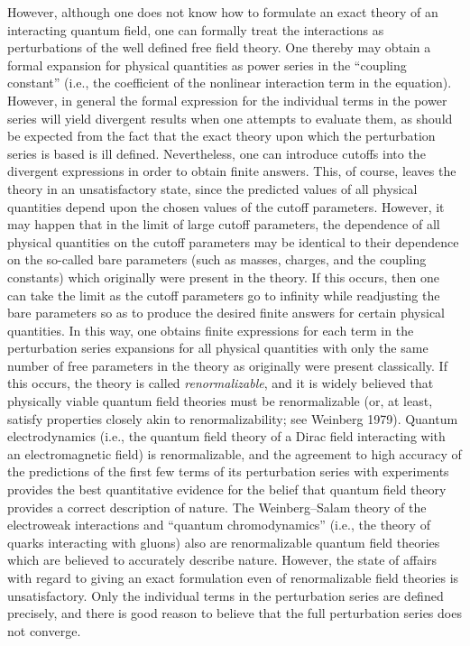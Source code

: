 However, although one does not know how to formulate an exact theory of an
interacting quantum field, one can formally treat the interactions as perturbations of
the well defined free field theory. One thereby may obtain a formal expansion for
physical quantities as power series in the ``coupling constant'' (i.e., the coefficient of
the nonlinear interaction term in the equation). However, in general the formal
expression for the individual terms in the power series will yield divergent results
when one attempts to evaluate them, as should be expected from the fact that the
exact theory upon which the perturbation series is based is ill defined. Nevertheless,
one can introduce cutoffs into the divergent expressions in order to obtain finite
answers. This, of course, leaves the theory in an unsatisfactory state, since the
predicted values of all physical quantities depend upon the chosen values of the
cutoff parameters. However, it may happen that in the limit of large cutoff parameters,
the dependence of all physical quantities on the cutoff parameters may be
identical to their dependence on the so-called bare parameters (such as masses,
charges, and the coupling constants) which originally were present in the theory. If
this occurs, then one can take the limit as the cutoff parameters go to infinity while
readjusting the bare parameters so as to produce the desired finite answers for certain
physical quantities. In this way, one obtains finite expressions for each term in the
perturbation series expansions for all physical quantities with only the same number
of free parameters in the theory as originally were present classically. If this occurs,
the theory is called \emph{renormalizable}, and it is widely believed that physically viable
quantum field theories must be renormalizable (or, at least, satisfy properties closely
akin to renormalizability; see Weinberg 1979). Quantum electrodynamics (i.e., the
quantum field theory of a Dirac field interacting with an electromagnetic field) is
renormalizable, and the agreement to high accuracy of the predictions of the first few
terms of its perturbation series with experiments provides the best quantitative
evidence for the belief that quantum field theory provides a correct description of
nature. The Weinberg--Salam theory of the electroweak interactions and ``quantum
chromodynamics'' (i.e., the theory of quarks interacting with gluons) also are
renormalizable quantum field theories which are believed to accurately describe nature.
However, the state of affairs with regard to giving an exact formulation even of
renormalizable field theories is unsatisfactory. Only the individual terms in the
perturbation series are defined precisely, and there is good reason to believe that the
full perturbation series does not converge.

